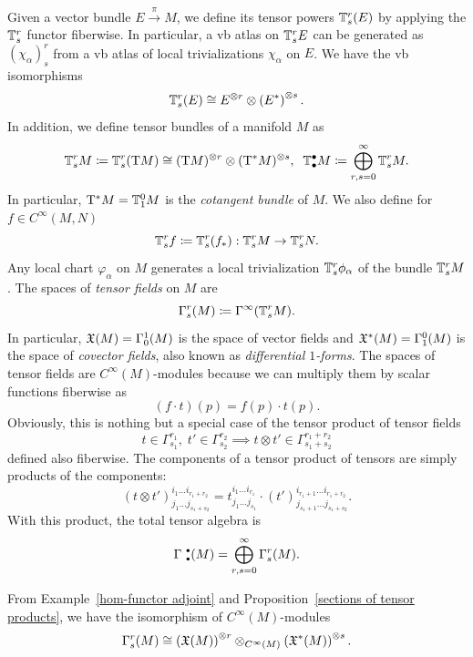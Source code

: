 \begin{defn}
    Given a vector bundle $E\overset{\pi}{\to}M$, we define its tensor powers $\mathbb{T}^r_s (E)$ by applying the $\mathbb{T}^r_s$ functor fiberwise. In particular, a \gls{vb} atlas on $\mathbb{T}^r_s E$ can be generated as $(\chi_\alpha)^r_s$ from a \gls{vb} atlas of local trivializations $\chi_\alpha$ on $E$.
    We have the \gls{vb} isomorphisms
    \[
    \mathbb{T}^r_s (E)\cong E^{\otimes r}\otimes \left(E^\ast\right)^{\otimes s}.
    \]
    In addition, we define tensor bundles of a manifold $M$ as
    \[
    \mathbb{T}^r_s M\coloneqq \mathbb{T}^r_s (\mathrm{T} M)\cong (\mathrm{T} M)^{\otimes r}\otimes (\mathrm{T}^\ast M)^{\otimes s},\;\; \mathbb{T}^\bullet_\bullet M\coloneqq \bigoplus_{r,s=0}^\infty \mathbb{T}^r_s M.
    \]
    In particular, $\mathrm{T}^\ast M=\mathbb{T}^0_1 M$ is the \emph{cotangent bundle} of $M$. We also define for $f\in C^\infty(M,N)$ 
    \[ \mathbb{T}^r_s f\coloneqq \mathbb{T}^r_s (f_\ast): \mathbb{T}^r_s M\to \mathbb{T}^r_s N.\]
    Any local chart $\varphi_\alpha$ on $M$ generates a local trivialization $\mathbb{T}^r_s \phi_\alpha$ of the bundle $\mathbb{T}^r_s M$.
    The spaces of \emph{tensor fields} on $M$ are 
    \[
    \Gamma^r_s(M)\coloneqq \Gamma^\infty(\mathbb{T}^r_s M).
    \]
    In particular, $\mathfrak{X}(M)=\Gamma^1_0(M)$ is the space of vector fields and $\mathfrak{X}^\ast(M)=\Gamma^0_1(M)$ is the space of \emph{covector fields}, also known as \emph{differential $1$-forms}. The spaces of tensor fields are $C^\infty(M)$-modules because we can multiply them by scalar functions fiberwise as
    \[
    (f\cdot t)(p)=f(p)\cdot t(p).
    \]
    Obviously, this is nothing but a special case of the tensor product of tensor fields
    \[t\in\Gamma^{r_1}_{s_1},\;t'\in\Gamma^{r_2}_{s_2}\implies t\otimes t' \in \Gamma^{r_1+r_2}_{s_1+s_2}\] defined also fiberwise. The components of a tensor product of tensors are simply products of the components:
    \[
    (t\otimes t')_{j_1 \ldots j_{s_1+s_2}}^{i_1\ldots i_{r_1+r_2}}=t_{j_1\ldots j_{s_1}}^{i_1\ldots i_{r_1}}\cdot (t')^{i_{r_1+1}\ldots i_{r_1+r_2}}_{j_{s_1+1}\ldots j_{s_1+s_2}}.
    \]
    With this product, the total tensor algebra is 
    \[\Gamma^{\smbullet }_{\smbullet }(M)=\bigoplus_{r,s=0}^\infty \Gamma^r_s(M).\]
\end{defn}


\begin{cor}
    From Example~\ref{hom-functor adjoint} and Proposition~\ref{sections of tensor products}, we have the isomorphism of $C^\infty(M)$-modules
    \[\Gamma^r_s (M)\cong \left(\mathfrak{X}(M)\right)^{\otimes r} \otimes_{C^\infty(M)}\left(\mathfrak{X}^\ast(M)\right)^{\otimes s}.\]
\end{cor}

